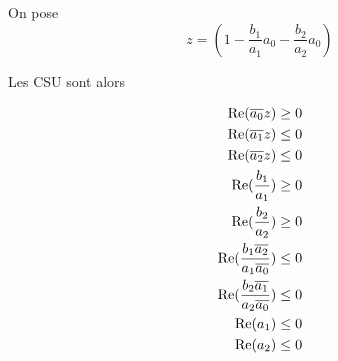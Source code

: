 
			On pose 
			\begin{equation}
				z = \left(1 - \frac{b_1}{a_1}a_0 - \frac{b_2}{a_2}a_0\right)
			\end{equation}

			Les CSU sont alors

			\begin{align}
				\operatorname{Re}({\overline{a_0}}z) \ge 0 \\
				\operatorname{Re}({\overline{a_1}}z) \le 0 \\
				\operatorname{Re}({\overline{a_2}}z) \le 0 \\
				\operatorname{Re}(\dfrac{b_1}{a_1}) \ge 0 \\
				\operatorname{Re}(\dfrac{b_2}{a_2}) \ge 0 \\
				\operatorname{Re}(\dfrac{b_1{\overline{a_2}}}{a_1{\overline{a_0}}}) \le 0 \\
				\operatorname{Re}(\dfrac{b_2{\overline{a_1}}}{a_2{\overline{a_0}}}) \le 0 \\
				\operatorname{Re}(a_1) \le 0 \\
				\operatorname{Re}(a_2) \le 0
			\end{align}